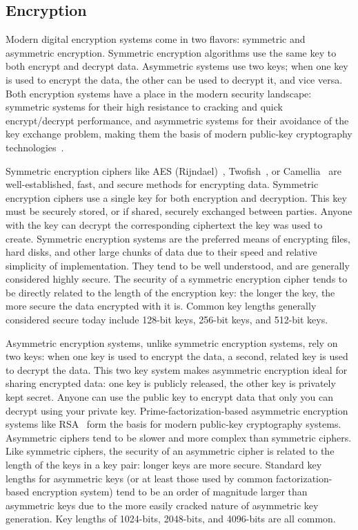 \subsection{Encryption}

Modern digital encryption systems come in two flavors: symmetric and
asymmetric encryption. Symmetric encryption algorithms use the same
key to both encrypt and decrypt data. Asymmetric systems use two keys;
when one key is used to encrypt the data, the other can be used to
decrypt it, and vice versa. Both encryption systems have a place in
the modern security landscape: symmetric systems for their high
resistance to cracking and quick encrypt/decrypt performance, and
asymmetric systems for their avoidance of the key exchange problem,
making them the basis of modern public-key cryptography
technologies~\cite{Menezes1996}.

Symmetric encryption ciphers like AES (Rijndael)~\cite{Daemen1999},
Twofish~\cite{Schneier1998}, or Camellia~\cite{Matsui2004} are
well-established, fast, and secure methods for encrypting
data. Symmetric encryption ciphers use a single key for both
encryption and decryption. This key must be securely stored, or if
shared, securely exchanged between parties. Anyone with the key can
decrypt the corresponding ciphertext the key was used to
create. Symmetric encryption systems are the preferred means of
encrypting files, hard disks, and other large chunks of data due to
their speed and relative simplicity of implementation. They tend to be
well understood, and are generally considered highly secure. The
security of a symmetric encryption cipher tends to be directly related
to the length of the encryption key: the longer the key, the more
secure the data encrypted with it is. Common key lengths generally
considered secure today include 128-bit keys, 256-bit keys, and
512-bit keys.

Asymmetric encryption systems, unlike symmetric encryption systems,
rely on two keys: when one key is used to encrypt the data, a second,
related key is used to decrypt the data. This two key system makes
asymmetric encryption ideal for sharing encrypted data: one key is
publicly released, the other key is privately kept secret. Anyone can
use the public key to encrypt data that only you can decrypt using
your private key. Prime-factorization-based asymmetric encryption
systems like RSA~\cite{Rivest1978, NIST2001} form the basis for modern
public-key cryptography systems. Asymmetric ciphers tend to be slower
and more complex than symmetric ciphers. Like symmetric ciphers, the
security of an asymmetric cipher is related to the length of the keys
in a key pair: longer keys are more secure. Standard key lengths for
asymmetric keys (or at least those used by common factorization-based
encryption system) tend to be an order of magnitude larger than
asymmetric keys due to the more easily cracked nature of asymmetric
key generation. Key lengths of 1024-bits, 2048-bits, and 4096-bits are
all common.

